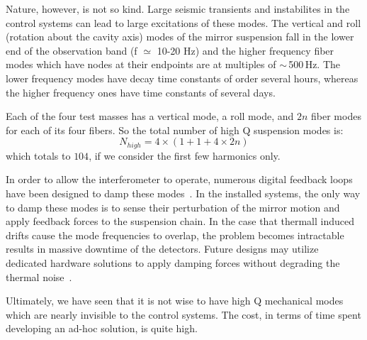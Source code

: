 Nature, however, is not so kind. Large seismic transients and instabilites in the control systems can lead to large excitations of these modes. The vertical and roll (rotation about the cavity axis)
modes of the mirror suspension fall in the lower end of the observation band
(f $\simeq$ 10-20 Hz) and the higher frequency fiber modes which have nodes at
their endpoints are at multiples of $\sim$\,500\,Hz. The lower frequency modes have
decay time constants of order several hours, whereas the higher frequency ones
have time constants of several days.

Each of the four test masses has a vertical mode, a roll mode, and $2n$ fiber modes
for each of its four fibers. So the total number of high Q suspension modes is:
\begin{equation}
N_{high} = 4 \times (1 + 1 + 4 \times 2n)
\end{equation}
which totals to $104$, if we consider the first few harmonics only.

In order to allow the interferometer to operate, numerous digital feedback
loops have been designed to damp these modes~\cite{martynov2015lock, Miller:ESD}. In the
installed systems, the only way to damp these modes is to sense their perturbation
of the mirror motion and apply feedback forces to the suspension chain. In the case
that thermall induced drifts cause the mode frequencies to overlap, the problem
becomes intractable results in massive downtime of the detectors. Future designs
may utilize dedicated hardware solutions to apply damping forces without degrading
the thermal noise~\cite{Dmitriev:2010hk, Lockerbie:2011zma}.

Ultimately, we have seen that it is not wise to have high Q mechanical modes
which are nearly invisible to the control systems. The cost, in terms of time
spent developing an ad-hoc solution, is quite high.



